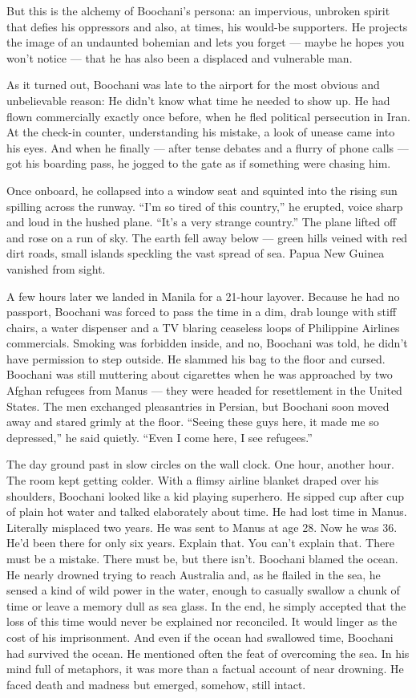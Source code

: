 But this is the alchemy of Boochani's persona: an impervious, unbroken
spirit that defies his oppressors and also, at times, his would-be
supporters. He projects the image of an undaunted bohemian and lets you
forget --- maybe he hopes you won't notice --- that he has also been a
displaced and vulnerable man.

As it turned out, Boochani was late to the airport for the most obvious
and unbelievable reason: He didn't know what time he needed to show up.
He had flown commercially exactly once before, when he fled political
persecution in Iran. At the check-in counter, understanding his mistake,
a look of unease came into his eyes. And when he finally --- after tense
debates and a flurry of phone calls --- got his boarding pass, he jogged
to the gate as if something were chasing him.

Once onboard, he collapsed into a window seat and squinted into the
rising sun spilling across the runway. ``I'm so tired of this country,''
he erupted, voice sharp and loud in the hushed plane. ``It's a very
strange country.'' The plane lifted off and rose on a run of sky. The
earth fell away below --- green hills veined with red dirt roads, small
islands speckling the vast spread of sea. Papua New Guinea vanished from
sight.

A few hours later we landed in Manila for a 21-hour layover. Because he
had no passport, Boochani was forced to pass the time in a dim, drab
lounge with stiff chairs, a water dispenser and a TV blaring ceaseless
loops of Philippine Airlines commercials. Smoking was forbidden inside,
and no, Boochani was told, he didn't have permission to step outside. He
slammed his bag to the floor and cursed. Boochani was still muttering
about cigarettes when he was approached by two Afghan refugees from
Manus --- they were headed for resettlement in the United States. The
men exchanged pleasantries in Persian, but Boochani soon moved away and
stared grimly at the floor. ``Seeing these guys here, it made me so
depressed,'' he said quietly. ``Even I come here, I see refugees.''

The day ground past in slow circles on the wall clock. One hour, another
hour. The room kept getting colder. With a flimsy airline blanket draped
over his shoulders, Boochani looked like a kid playing superhero. He
sipped cup after cup of plain hot water and talked elaborately about
time. He had lost time in Manus. Literally misplaced two years. He was
sent to Manus at age 28. Now he was 36. He'd been there for only six
years. Explain that. You can't explain that. There must be a mistake.
There must be, but there isn't. Boochani blamed the ocean. He nearly
drowned trying to reach Australia and, as he flailed in the sea, he
sensed a kind of wild power in the water, enough to casually swallow a
chunk of time or leave a memory dull as sea glass. In the end, he simply
accepted that the loss of this time would never be explained nor
reconciled. It would linger as the cost of his imprisonment. And even if
the ocean had swallowed time, Boochani had survived the ocean. He
mentioned often the feat of overcoming the sea. In his mind full of
metaphors, it was more than a factual account of near drowning. He faced
death and madness but emerged, somehow, still intact.

